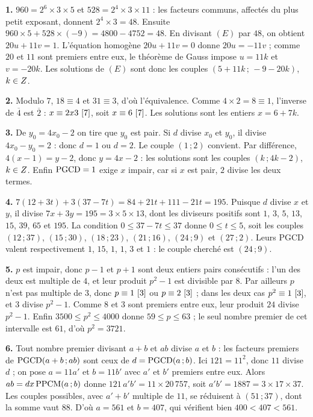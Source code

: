 \begin{corrige}[annales]
\textbf{1.} $960 = 2^{6}\times3\times5$ et $528 = 2^{4}\times3\times11$ : les
facteurs communs, affectés du plus petit exposant, donnent
$2^{4}\times3 = 48$. Ensuite $960\times5+528\times(-9) = 4800-4752 = 48$. En
divisant $(E)$ par $48$, on obtient $20u+11v = 1$. L'équation homogène
$20u+11v = 0$ donne $20u = -11v$ ; comme $20$ et $11$ sont premiers entre eux,
le théorème de Gauss impose $u = 11k$ et $v = -20k$. Les solutions de $(E)$
sont donc les couples $(5+11k\,;\,-9-20k)$, $k \in Z$.

\textbf{2.} Modulo $7$, $18 \equiv 4$ et $31 \equiv 3$, d'où l'équivalence.
Comme $4\times2 = 8 \equiv 1$, l'inverse de $\overline4$ est $\overline2$ :
$x \equiv 2x3 \ [7]$, soit $x \equiv 6 \ [7]$. Les solutions sont les
entiers $x = 6+7k$.

\textbf{3.} De $y_{0} = 4x_{0}-2$ on tire que $y_{0}$ est pair. Si $d$ divise
$x_{0}$ et $y_{0}$, il divise $4x_{0}-y_{0} = 2$ : donc $d = 1$ ou $d = 2$.
Le couple $(1\,;2)$ convient. Par différence, $4(x-1) = y-2$, donc
$y = 4x-2$ : les solutions sont les couples $(k\,;4k-2)$, $k \in Z$. Enfin
$\operatorname{PGCD} = 1$ exige $x$ impair, car si $x$ est pair, $2$ divise les deux termes.

\textbf{4.} $7(12+3t)+3(37-7t) = 84+21t+111-21t = 195$. Puisque $d$ divise $x$
et $y$, il divise $7x+3y = 195 = 3\times5\times13$, dont les diviseurs
positifs sont $1$, $3$, $5$, $13$, $15$, $39$, $65$ et $195$. La condition
$0 \leq 37-7t \leq 37$ donne $0 \leq t \leq 5$, soit les couples
$(12\,;37)$, $(15\,;30)$, $(18\,;23)$, $(21\,;16)$, $(24\,;9)$ et
$(27\,;2)$. Leurs PGCD valent respectivement $1$, $15$, $1$, $1$, $3$ et $1$ :
le couple cherché est $(24\,;9)$.

\textbf{5.} $p$ est impair, donc $p-1$ et $p+1$ sont deux entiers pairs
consécutifs : l'un des deux est multiple de $4$, et leur produit $p^{2}-1$ est
divisible par $8$. Par ailleurs $p$ n'est pas multiple de $3$, donc
$p \equiv 1 \ [3]$ ou $p \equiv 2 \ [3]$ ; dans les deux cas
$p^{2} \equiv 1 \ [3]$, et $3$ divise $p^{2}-1$. Comme $8$ et $3$ sont
premiers entre eux, leur produit $24$ divise $p^{2}-1$. Enfin
$3500 \leq p^{2} \leq 4000$ donne $59 \leq p \leq 63$ ; le seul nombre premier
de cet intervalle est $61$, d'où $p^{2} = 3721$.

\textbf{6.} Tout nombre premier divisant $a+b$ et $ab$ divise $a$ et $b$ : les
facteurs premiers de $\operatorname{PGCD}(a+b\,;ab)$ sont ceux de $d = \operatorname{PGCD}(a\,;b)$. Ici
$121 = 11^{2}$, donc $11$ divise $d$ ; on pose $a = 11a'$ et $b = 11b'$ avec
$a'$ et $b'$ premiers entre eux. Alors $ab = d x \operatorname{PPCM}(a\,;b)$ donne
$121\,a'b' = 11 \times 20\,757$, soit $a'b' = 1887 = 3\times17\times37$. Les
couples possibles, avec $a'+b'$ multiple de $11$, se réduisent à
$(51\,;37)$, dont la somme vaut $88$. D'où $a = 561$ et $b = 407$, qui
vérifient bien $400<407<561$.


\end{corrige}
